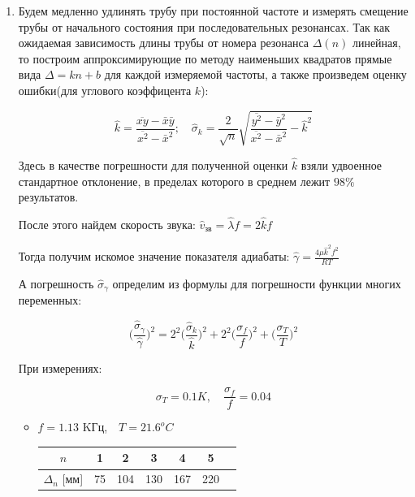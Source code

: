 \documentclass[12pt]{article}
\begin{document}
    \begin{enumerate}
    \item 
         Будем медленно удлинять трубу при постоянной частоте и измерять смещение трубы от начального состояния при последовательных резонансах.
    Так как ожидаемая зависимость длины трубы от номера резонанса $\Delta(n)$ линейная, то построим аппроксимирующие по методу наименьших квадратов прямые вида $\Delta = kn + b$ для каждой измеряемой частоты, а также произведем оценку ошибки(для углового коэффицента $k$):

    \begin{equation}
        \hat{k} = \frac{\overline{xy} - \bar{x}\bar{y}}{\overline{x^2} - \bar{x}^2} ;\quad \hat{\sigma}_k = \frac{2}{\sqrt{n}}\sqrt{\frac{\overline{y^2} - \bar{y}^2}{\overline{x^2} - \bar{x}^2} - \hat{k}^2}
    \end{equation}

    Здесь в качестве погрешности для полученной оценки $\hat{k}$  взяли удвоенное стандартное отклонение, в пределах которого в среднем лежит $98\%$ результатов.

    После этого найдем скорость звука: $\hat{v}_\text{зв} = \hat{\lambda} f = 2 \hat{k} f$

    Тогда получим искомое значение показателя адиабаты: $\hat{\gamma} = \frac{4\mu \hat{k}^2 f^2}{RT}$ 

    А погрешность $\hat{\sigma}_\gamma$ определим из формулы для погрешности функции многих переменных:

    \begin{equation}
        \bigg(\frac{\hat{\sigma}_\gamma}{\hat{\gamma}}\bigg) ^ 2 =    2^2 \bigg(\frac{\hat{\sigma}_k}{\hat{k}}\bigg) ^ 2 + 2^2 \bigg(\frac{\sigma_f}{f}\bigg) ^ 2 + \bigg(\frac{\sigma_T}{T}\bigg) ^ 2
    \end{equation}


    При измерениях:

    \begin{equation}
        \sigma_T = 0.1 K, \quad \frac{\sigma_f}{f} = 0.04 
    \end{equation}

    \begin{itemize}
        \item $f = 1.13$ KГц,$ \quad T = 21.6^o C$

        \begin{center}
                    \begin{tabular}{|c|c|c|c|c|c|c|}
                            \hline 
                                $n$ & 1 & 2 & 3 & 4 & 5 \\
                            \hline
                                $\Delta_n$ [мм]& 75&104&130&167&220\\
                            \hline
                    \end{tabular}
        \end{center}


\end{itemize}
\end{enumerate}
\end{document}
